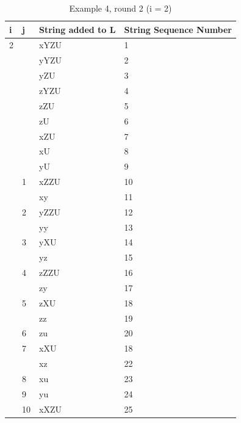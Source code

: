 \documentclass{sig-alternate-05-2015}
\begin{document}
\begin{table}[]
\centering
\caption{Example 4, round 2 (i = 2)}
\label{table:Example4Roud2}
\begin{tabular}{|l|l|l|l|}
\hline
i & j  & String added to L & String Sequence Number \\
\hline
2 &    & xYZU              & 1                      \\
  &    & yYZU              & 2                      \\
  &    & yZU               & 3                      \\
  &    & zYZU              & 4                      \\
  &    & zZU               & 5                      \\
  &    & zU                & 6                      \\
  &    & xZU               & 7                      \\
  &    & xU                & 8                      \\
  &    & yU                & 9                      \\
  & 1  & xZZU              & 10                     \\
  &    & xy                & 11                     \\
  & 2  & yZZU              & 12                     \\
  &    & yy                & 13                     \\
  & 3  & yXU               & 14                     \\
  &    & yz                & 15                     \\
  & 4  & zZZU              & 16                     \\
  &    & zy                & 17                     \\
  & 5  & zXU               & 18                     \\
  &    & zz                & 19                     \\
  & 6  & zu                & 20                     \\
  & 7  & xXU               & 18                     \\
  &    & xz                & 22                     \\
  & 8  & xu                & 23                     \\
  & 9  & yu                & 24                     \\
  & 10 & xXZU              & 25                     \\

\end{tabular}
\end{table}
\end{document}
